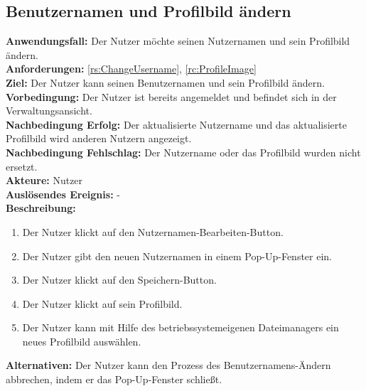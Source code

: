 \documentclass[parskip=full]{scrartcl}
\begin{document}
\subsection{Benutzernamen und Profilbild ändern}
\textbf{Anwendungsfall:} Der Nutzer möchte seinen Nutzernamen und sein Profilbild ändern.\\
\textbf{Anforderungen:} \ref{rs:ChangeUsername}, \ref{rc:ProfileImage}\\
\textbf{Ziel:} Der Nutzer kann seinen Benutzernamen und sein Profilbild ändern.\\
\textbf{Vorbedingung:} Der Nutzer ist bereits angemeldet und befindet sich in der Verwaltungsansicht.\\
\textbf{Nachbedingung Erfolg:} Der aktualisierte Nutzername und das aktualisierte Profilbild wird anderen Nutzern angezeigt.\\
\textbf{Nachbedingung Fehlschlag:} Der Nutzername oder das Profilbild wurden nicht ersetzt.\\
\textbf{Akteure:} Nutzer\\
\textbf{Auslösendes Ereignis:} -\\
\textbf{Beschreibung:}
\begin{enumerate}
    \item Der Nutzer klickt auf den Nutzernamen-Bearbeiten-Button.
    \item Der Nutzer gibt den neuen Nutzernamen in einem Pop-Up-Fenster ein.
    \item Der Nutzer klickt auf den Speichern-Button.
    \item Der Nutzer klickt auf sein Profilbild.
    \item Der Nutzer kann mit Hilfe des betriebssystemeigenen Dateimanagers ein neues Profilbild auswählen.
\end{enumerate}
\textbf{Alternativen:} Der Nutzer kann den Prozess des Benutzernamens-Ändern abbrechen, indem er das Pop-Up-Fenster schließt.
\newpage
\end{document}
